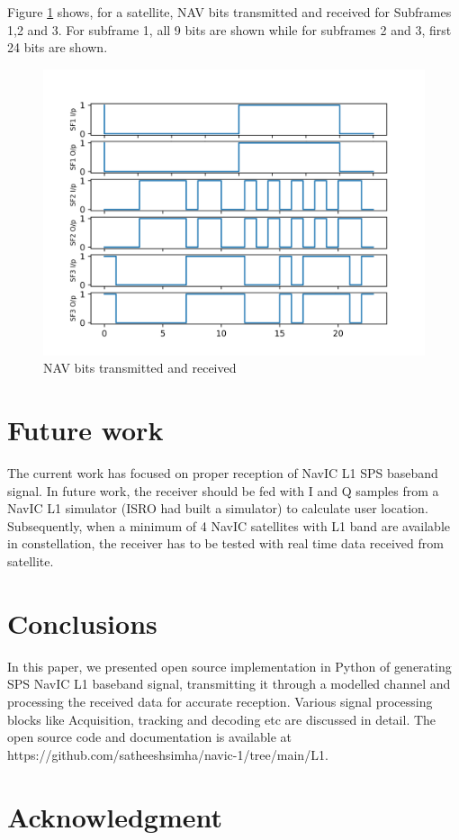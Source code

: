 \documentclass[conference]{IEEEtran}
\begin{document}
Figure \ref{fig:navbits_output} shows, for a satellite, NAV bits transmitted and received for Subframes 1,2 and 3. 
For subframe 1, all 9 bits are shown while for subframes 2 and 3, first 24 bits are shown.

\begin{figure}[ht]
	\centering
	\includegraphics[width=0.75\columnwidth]{figs/mynavbits.png}
	\centering
	\caption{NAV bits transmitted and received}
	\label{fig:navbits_output}
\end{figure}

\section {Future work}
The current work has focused on proper reception of NavIC L1 SPS baseband signal. In future work, 
the receiver should be fed with I and Q samples from a NavIC L1 simulator (ISRO had built a 
simulator) to calculate user location. Subsequently, when a minimum of 4 NavIC satellites with L1 
band are available in constellation, the receiver has to be tested with real time data received 
from satellite.
\section {Conclusions}
In this paper, we presented open source implementation in Python of generating SPS NavIC L1 baseband 
signal, transmitting it through a modelled channel and processing the received data for accurate reception.
Various signal processing blocks like Acquisition, tracking and decoding  etc are discussed in detail. The open source
code and documentation is available at https://github.com/satheeshsimha/navic-1/tree/main/L1.

\section*{Acknowledgment}
\end{document}
